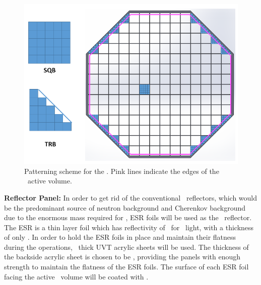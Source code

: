 \begin{figure}[t!]
\centering
\includegraphics[width=\columnwidth]{Figures/TPC-SiPM_pattern.png}
\caption[\DSkPdm\ patterning scheme]{Patterning scheme for the \DSkPdms.  Pink lines indicate the edges of the \TPC\ active volume.}
\label{fig:TPC-SiPM_pattern}
\end{figure} 

{\bf Reflector Panel:} In order to get rid of the conventional \PTFE\ reflectors, which would be the predominant source of neutron background and Cherenkov background due to the enormous mass required for \DSks, ESR foils will be used as the \TPC\ reflector. The ESR is a thin layer foil which has reflectivity of \DSkESRReflectivity\ for \DSfPMTWaveLength\ light, with a thickness of only \DSkESRThickness.  In order to hold the ESR foils in place and maintain their flatness during the operations, \DSkPMMATPCBackPanelThicknessESR\ thick UVT acrylic sheets will be used. The thickness of the backside acrylic sheet is chosen to be \DSkPMMATPCBackPanelThicknessESR, providing the panels with enough strength to maintain the flatness of the ESR foils. %
The surface of each ESR foil facing the active \LAr\ volume will be coated with \TPB. 

